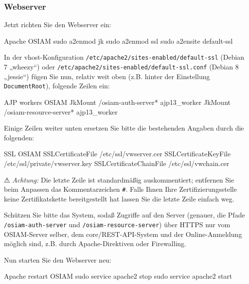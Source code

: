 \subsubsection{Webserver}\label{subsubsec:setup-osiam-apache}

\begin{minipage}{\textwidth}
Jetzt richten Sie den Webserver ein:

\begin{lstdump}{Apache OSIAM}
sudo a2enmod jk
sudo a2enmod ssl
sudo a2ensite default-ssl
\end{lstdump}
\end{minipage}

\begin{minipage}{\textwidth}
In der vhost-Konfiguration \texttt{/etc/apache2/sites-enabled/default-ssl}
(Debian 7 „wheezy“) oder \texttt{/etc/apache2/sites-enabled/default-ssl.conf}
(Debian 8 „jessie“) fügen Sie nun, relativ weit oben (z.B. hinter der Einstellung
\texttt{DocumentRoot}), folgende Zeilen ein:

\begin{lstdump}{AJP workers OSIAM}
JkMount /osiam-auth-server* ajp13_worker
JkMount /osiam-resource-server* ajp13_worker
\end{lstdump}
\end{minipage}

\begin{minipage}{\textwidth}
Einige Zeilen weiter unten ersetzen Sie bitte die bestehenden
Angaben durch die folgenden:

\begin{lstdump}{SSL OSIAM}
SSLCertificateFile /etc/ssl/vwserver.cer
SSLCertificateKeyFile /etc/ssl/private/vwserver.key
SSLCertificateChainFile /etc/ssl/vwchain.cer
\end{lstdump}

⚠ \emph{Achtung:} Die letzte Zeile ist standardmäßig auskommentiert;
entfernen Sie beim Anpassen das Kommentarzeichen \texttt{\#}. Falls
Ihnen Ihre Zertifizierungsstelle keine Zertifikatskette bereitgestellt
hat lassen Sie die letzte Zeile einfach weg.
\end{minipage}

Schützen Sie bitte das System, sodaß Zugriffe auf den Server (genauer,
die Pfade \texttt{/osiam-auth-server} und \texttt{/osiam-resource-server})
über HTTPS nur vom OSIAM-Server selber, dem core/REST-API-System und der
Online-Anmeldung möglich sind, z.B. durch Apache-Direktiven oder Firewalling.

\begin{minipage}{\textwidth}
Nun starten Sie den Webserver neu:

\begin{lstdump}{Apache restart OSIAM}
sudo service apache2 stop
sudo service apache2 start
\end{lstdump}
\end{minipage}


